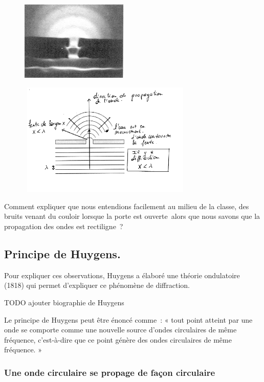 \begin{figure}
\centering
\includegraphics[width=5.166cm,height=3.817cm]{Pictures/100000010000010C000000C6588B9A00B1CFD310.png}
\caption{}
\end{figure}

\begin{figure}
\centering
\includegraphics[width=8.348cm,height=5.408cm]{Pictures/10000001000002060000015BBB1606831ABACDE3.png}
\caption{}
\end{figure}

Comment expliquer que nous entendions facilement au milieu
de la classe, des bruits venant du couloir lorsque la porte est
ouverte~alors que nous savons que la propagation des ondes est
rectiligne~?

\subsection{Principe de Huygens.}

Pour expliquer ces observations, Huygens a élaboré une théorie
ondulatoire (1818) qui permet d'expliquer ce phénomène de diffraction.

TODO ajouter biographie de Huygens

Le principe de Huygens peut être énoncé comme~: « tout point atteint par une onde se
comporte comme une nouvelle source d'ondes circulaires de même
fréquence, c'est-à-dire que ce point génère des ondes circulaires de
même fréquence. »

\subsubsection{Une onde circulaire se propage de façon circulaire }

